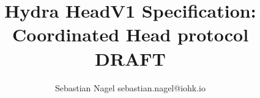 \documentclass[11pt]{article}
\begin{document}
\title{\Large \textbf{Hydra HeadV1 Specification: Coordinated Head protocol}\\[2ex] DRAFT}
\author{Sebastian Nagel sebastian.nagel@iohk.io}

\maketitle







\clearpage


\clearpage


\clearpage


\end{document}
